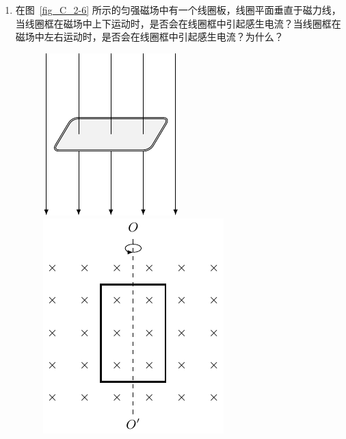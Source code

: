 \begin{enumerate}
    \item 在图~\ref{fig_C_2-6} 所示的匀强磁场中有一个线圈板，线圈平面垂直于磁力线，当线圈框在磁场中上下运动时，是否会在线圈框中引起感生电流？当线圈框在磁场中左右运动时，是否会在线圈框中引起感生电流？为什么？
\begin{figure}[htbp]
    \centering
    \begin{minipage}[t]{0.48\textwidth}
        \centering
        \includegraphics{fig/C/2-6.pdf}
        \caption{}\label{fig_C_2-6}
    \end{minipage}
    \begin{minipage}[t]{0.48\textwidth}
        \centering
        \includegraphics{fig/C/2-7.pdf}
        \caption{}\label{fig_C_2-7}
    \end{minipage}
\end{figure}


\end{enumerate}
